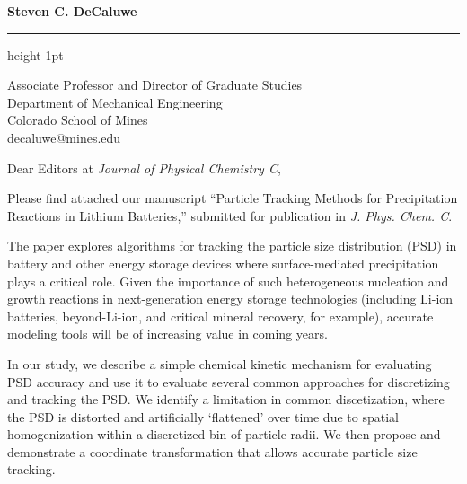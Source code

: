 \documentclass{letter} %
\begin{document}
\longindentation=0pt                       %
\let\raggedleft\raggedright                %
 
 
\begin{letter}{ }

\vspace{-20mm}
\begin{flushleft}
{\large\bf Steven C. DeCaluwe}
\end{flushleft}
\medskip\hrule height 1pt
\begin{flushright}
\hfill Associate Professor and Director of Graduate Studies\\
\hfill Department of Mechanical Engineering \\
\hfill Colorado School of Mines \\
\hfill decaluwe@mines.edu\\
\end{flushright} 

\opening{Dear Editors at {\it Journal of Physical Chemistry C},} 

\noindent Please find attached our manuscript ``Particle Tracking Methods for Precipitation Reactions in Lithium Batteries,'' submitted for publication in \emph{J. Phys. Chem. C}. 

The paper explores algorithms for tracking the particle size distribution (PSD) in battery and other energy storage devices where surface-mediated precipitation plays a critical role. Given the importance of such heterogeneous nucleation and growth reactions in next-generation energy storage technologies (including Li-ion batteries, beyond-Li-ion, and critical mineral recovery, for example), accurate modeling tools will be of increasing value in coming years.

In our study, we describe a simple chemical kinetic mechanism for evaluating PSD accuracy and use it to evaluate several common approaches for discretizing and tracking the PSD. We identify a limitation in common discetization, where the PSD is distorted and artificially `flattened' over time due to spatial homogenization within a discretized bin of particle radii. We then propose and demonstrate a coordinate transformation that allows accurate particle size tracking. 


\end{letter}
\end{document}
